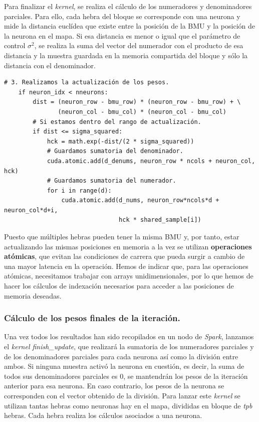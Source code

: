 Para finalizar el \textit{kernel}, se realiza el cálculo de los numeradores y denominadores parciales. Para ello, cada hebra del bloque se corresponde con una neurona y mide la distancia euclídea que existe entre la posición de la BMU y la posición de la neurona en el mapa. Si esa distancia es menor o igual que el parámetro de control $\sigma^2$, se realiza la suma del vector del numerador con el producto de esa distancia y la muestra guardada en la memoria compartida del bloque y sólo la distancia con el denominador. \\
\begin{code}
\begin{verbatim}
# 3. Realizamos la actualización de los pesos.
    if neuron_idx < nneurons:
        dist = (neuron_row - bmu_row) * (neuron_row - bmu_row) + \
               (neuron_col - bmu_col) * (neuron_col - bmu_col)
        # Si estamos dentro del rango de actualización.
        if dist <= sigma_squared:
            hck = math.exp(-dist/(2 * sigma_squared))
            # Guardamos sumatoria del denominador.
            cuda.atomic.add(d_denums, neuron_row * ncols + neuron_col, hck)
            # Guardamos sumatoria del numerador.
            for i in range(d):
                cuda.atomic.add(d_nums, neuron_row*ncols*d + neuron_col*d+i,
                                hck * shared_sample[i])
\end{verbatim}
\label{code:somiter3}
\end{code}


Puesto que múltiples hebras pueden tener la misma BMU y, por tanto, estar actualizando las mismas posiciones en memoria a la vez se utilizan \textbf{operaciones atómicas}, que evitan las condiciones de carrera que pueda surgir a cambio de una mayor latencia en la operación. Hemos de indicar que, para las operaciones atómicas, necesitamos trabajar con arrays unidimensionales, por lo que hemos de hacer los cálculos de indexación necesarios para acceder a las posiciones de memoria deseadas.

\subsubsection{Cálculo de los pesos finales de la iteración.}
Una vez todos los resultados han sido recopilados en un nodo de \textit{Spark}, lanzamos el \textit{kernel finish\_update}, que realizará la sumatoria de los numeradores parciales y de los denominadores parciales para cada neurona así como la división entre ambos. Si ninguna muestra activó la neurona en cuestión, es decir, la suma de todos sus denominadores parciales es 0, se mantendrán los pesos de la iteración anterior para esa neurona. En caso contrario,  los pesos de la neurona se corresponden con el vector obtenido de la división. Para lanzar este \textit{kernel} se utilizan tantas hebras como neuronas hay en el mapa, divididas en bloque de \textit{tpb} hebras. Cada hebra realiza los cálculos asociados a una neurona.

